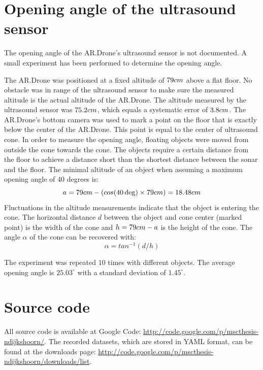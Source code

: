 \chapter{Opening angle of the ultrasound sensor}
\label{appendix:opening_angle}

The opening angle of the AR.Drone's ultrasound sensor is not documented.
A small experiment has been performed to determine the opening angle.

The AR.Drone was positioned at a fixed altitude of $79\small{cm}$ above a flat floor.
No obstacle was in range of the ultrasound sensor to make sure the measured altitude is the actual altitude of the AR.Drone.
The altitude measured by the ultrasound sensor was $75.2\small{cm}$, which equals a systematic error of $3.8\small{cm}$.
The AR.Drone's bottom camera was used to mark a point on the floor that is exactly below the center of the AR.Drone.
This point is equal to the center of ultrasound cone.
In order to measure the opening angle, floating objects were moved from outside the cone towards the cone.
The objects require a certain distance from the floor to achieve a distance short than the shortest distance between the sonar and the floor.
The minimal altitude of an object when assuming a maximum opening angle of $40$ degrees is:
\begin{equation}
a = 79\small{cm} - (cos(40\deg) \times 79\small{cm}) = 18.48\small{cm}
\end{equation}
Fluctuations in the altitude measurements indicate that the object is entering the cone.
The horizontal distance $d$ between the object and cone center (marked point) is the width of the cone and $h = 79\small{cm} - a$ is the height of the cone.
The angle $\alpha$ of the cone can be recovered with:
\begin{equation}
\alpha = tan^{-1}(d / h)
\end{equation}

The experiment was repeated $10$ times with different objects.
The average opening angle is $25.03^{\circ}$ with a standard deviation of $1.45^{\circ}$.





\chapter{Source code}
All source code is available at Google Code: \url{http://code.google.com/p/mscthesis-ndijkshoorn/}.
The recorded datasets, which are stored in YAML format, can be found at the downloads page: \url{http://code.google.com/p/mscthesis-ndijkshoorn/downloads/list}.

